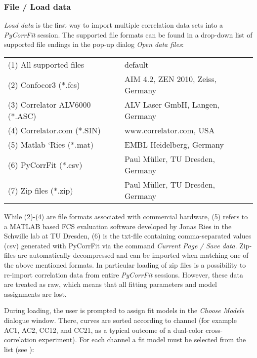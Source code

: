 \subsubsection{File / Load data}
\label{sec:menub.filem.loadd}
\textit{Load data }is the first way to import multiple correlation data sets into a \textit{PyCorrFit} session. The supported file formats can be found in a drop-down list of supported file endings in the pop-up dialog \textit{Open data files}:


\begin{tabular}{l l}
 \rule{0pt}{3ex}  (1) All supported files & default \\
 \rule{0pt}{3ex} (2) Confocor3 (*.fcs) & AIM 4.2, ZEN 2010, Zeiss, Germany \\
 \rule{0pt}{3ex} (3) Correlator ALV6000 (*.ASC) & ALV Laser GmbH, Langen, Germany \\
 \rule{0pt}{3ex} (4) Correlator.com (*.SIN) & www.correlator.com, USA \\
 \rule{0pt}{3ex} (5) Matlab ‘Ries (*.mat) & EMBL Heidelberg, Germany \\
 \rule{0pt}{3ex} (6) PyCorrFit (*.csv) & Paul Müller, TU Dresden, Germany \\
 \rule{0pt}{3ex} (7) Zip files (*.zip) & Paul Müller, TU Dresden, Germany \\
\end{tabular}
\vspace{3ex}
\newline
While (2)-(4) are file formats associated with commercial hardware, (5) refers to a MATLAB based FCS evaluation software developed by Jonas Ries in the Schwille lab at TU Dresden, (6) is the txt-file containing comma-separated values (csv) generated with PyCorrFit via the command \textit{Current Page / Save data}. Zip-files are automatically decompressed and can be imported when matching one of the above mentioned formats. In particular loading of zip files is a possibility to re-import correlation data from entire \textit{PyCorrFit} sessions. However, these data are treated as raw, which means that all fitting parameters and model assignments are lost.

During loading, the user is prompted to assign fit models in the \textit{Choose Models} dialogue window. There, curves are sorted according to channel (for example AC1, AC2, CC12, and CC21, as a typical outcome of a dual-color cross-correlation experiment). For each channel a fit model must be selected from the list (see ):

